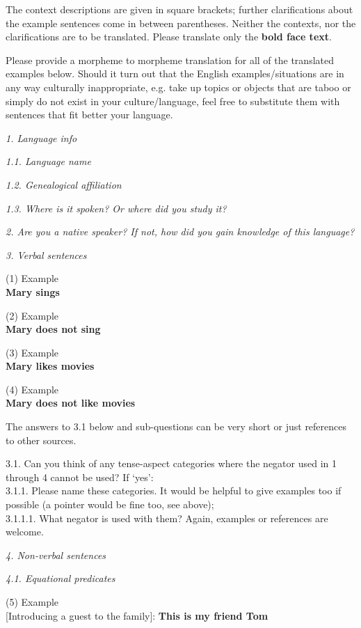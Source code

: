﻿\documentclass[output=paper]{langsci/langscibook}
\begin{document}
\begin{unindented}
The context descriptions are given in square brackets; further clarifications about the example sentences come in between parentheses. Neither the contexts, nor the clarifications are to be translated. Please translate only the \textbf{bold face text}. 

Please provide a morpheme to morpheme translation for all of the translated examples below. Should it turn out that the English examples/situations are in any way culturally inappropriate, e.g. take up topics or objects that are taboo or simply do not exist in your culture/language, feel free to substitute them with sentences that fit better your language. 

\textit{1. Language info}

\textit{1.1. Language name}

\textit{1.2. Genealogical affiliation}

\textit{1.3. Where is it spoken? Or where did you study it?}

\textit{2. Are you a native speaker? If not, how did you gain knowledge of
this language?}

\textit{3. Verbal sentences} 

(1) Example \\
\textbf{Mary sings} 

(2) Example \\
\textbf{Mary does not sing} 

(3) Example \\
\textbf{Mary likes movies} 

(4) Example \\
\textbf{Mary does not like movies} 

The answers to 3.1 below and sub-questions can be very short or just
references to other sources. 

3.1. Can you think of any tense-aspect categories where the negator used
in 1 through 4 cannot be used? If `yes':\\
3.1.1. Please name these categories. It would be helpful to give examples
too if possible (a pointer would be fine too, see above); \\
3.1.1.1. What negator is used with them? Again, examples or references are
welcome. 

\textit{4. Non-verbal sentences} 

\textit{4.1. Equational predicates}

(5) Example\\
{}[Introducing a guest to the family]: \textbf{This is my friend Tom}


\end{unindented}
\end{document}
